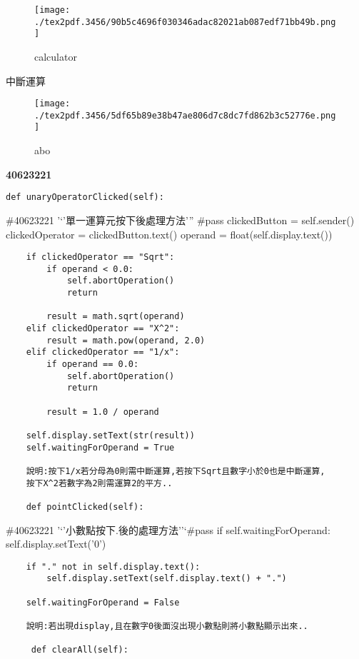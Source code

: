 \documentclass[12pt,,]{report}
\begin{document}
\begin{figure}
\centering
\texttt{[image: ./tex2pdf.3456/90b5c4696f030346adac82021ab087edf71bb49b.png]}
\caption{calculator\label{fig:計算}}
\end{figure}

中斷運算

\begin{figure}
\centering
\texttt{[image: ./tex2pdf.3456/5df65b89e38b47ae806d7c8dc7fd862b3c52776e.png]}
\caption{abo\label{fig:中斷運算}}
\end{figure}

\textbf{40623221}

\begin{verbatim}
def unaryOperatorClicked(self):
\end{verbatim}

\#40623221 '`'單一運算元按下後處理方法''' \#pass clickedButton =
self.sender() clickedOperator = clickedButton.text() operand =
float(self.display.text())

\begin{verbatim}
    if clickedOperator == "Sqrt":
        if operand < 0.0:
            self.abortOperation()
            return

        result = math.sqrt(operand)
    elif clickedOperator == "X^2":
        result = math.pow(operand, 2.0)
    elif clickedOperator == "1/x":
        if operand == 0.0:
            self.abortOperation()
            return

        result = 1.0 / operand

    self.display.setText(str(result))
    self.waitingForOperand = True
    
    說明:按下1/x若分母為0則需中斷運算,若按下Sqrt且數字小於0也是中斷運算,
    按下X^2若數字為2則需運算2的平方..
    
    def pointClicked(self):
\end{verbatim}

\#40623221 '`'小數點按下.後的處理方法''`\#pass if
self.waitingForOperand: self.display.setText('0')

\begin{verbatim}
    if "." not in self.display.text():
        self.display.setText(self.display.text() + ".")

    self.waitingForOperand = False
    
    說明:若出現display,且在數字0後面沒出現小數點則將小數點顯示出來..
    
     def clearAll(self):
\end{verbatim}
\end{document}
